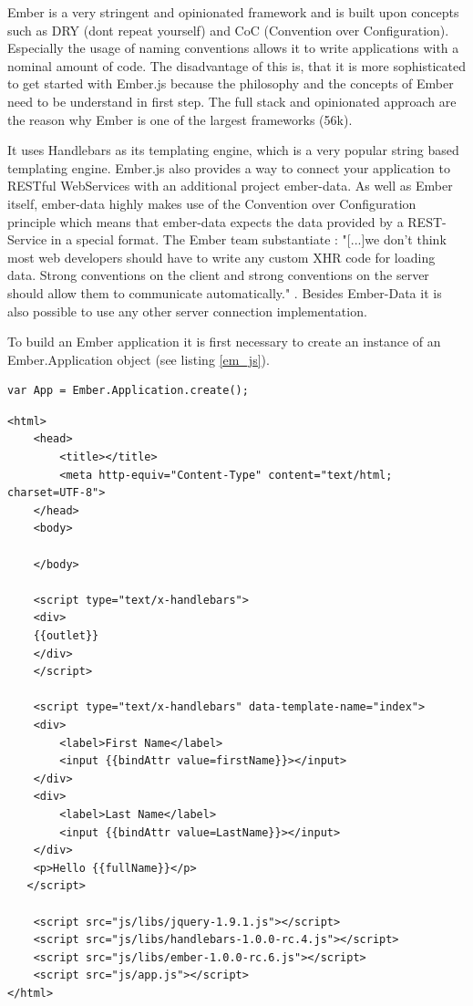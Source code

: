 Ember is a very stringent and opinionated framework and is built upon concepts such as DRY (dont repeat yourself) and CoC (Convention over Configuration).
Especially the usage of naming conventions allows it to write applications with a nominal amount of code.
The disadvantage of this is, that it is more sophisticated to get started with Ember.js because the philosophy and the concepts of Ember need to be understand in first step.
The full stack and opinionated approach are the reason why Ember is one of the largest frameworks (56k).

It uses Handlebars as its templating engine, which is a very popular string based templating engine.
Ember.js also provides a way to connect your application to RESTful WebServices with an additional project ember-data.
As well as Ember itself, ember-data highly makes use of the Convention over Configuration principle which means that ember-data expects the data provided by a REST-Service in a special format.
The Ember team substantiate : "[...]we don't think most web developers should have to write any custom XHR code for loading data.
Strong conventions on the client and strong conventions on the server should allow them to communicate automatically." \autocite{tech-ana:ember-data}.
Besides Ember-Data it is also possible to use any other server connection implementation.

To build an Ember application it is first necessary to create an instance of an Ember.Application object (see listing \ref{em_js}).
\begin{lstlisting}[label=em_js, caption=app.js]
var App = Ember.Application.create();
\end{lstlisting}

\begin{lstlisting}[label=em_html,caption=index.html]
<html>
    <head>
        <title></title>
        <meta http-equiv="Content-Type" content="text/html; charset=UTF-8">
    </head>
    <body>

    </body>
    
    <script type="text/x-handlebars">
	<div>
	{{outlet}}
	</div>
    </script>

    <script type="text/x-handlebars" data-template-name="index">
	<div>
		<label>First Name</label> 
		<input {{bindAttr value=firstName}}></input>
	</div>
	<div>
		<label>Last Name</label> 
		<input {{bindAttr value=LastName}}></input>
	</div>
	<p>Hello {{fullName}}</p>
   </script>

    <script src="js/libs/jquery-1.9.1.js"></script>
    <script src="js/libs/handlebars-1.0.0-rc.4.js"></script>
    <script src="js/libs/ember-1.0.0-rc.6.js"></script>
    <script src="js/app.js"></script>
</html>
\end{lstlisting}

